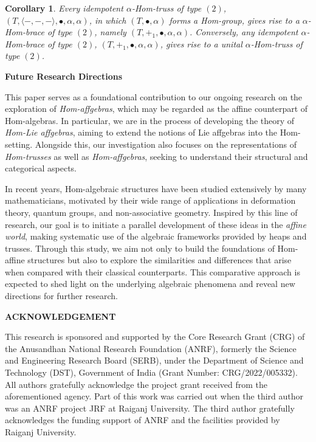 \documentclass[14pt]{article}
\theoremstyle{Definition}
\newtheorem{Coro}[thm]{Corollary}
\theoremstyle{remark}
\begin{document}
\begin{Coro}
Every idempotent $\alpha$-Hom-truss of type $(2)$, 
$(T,\langle -,-,- \rangle,\bullet,\alpha,\alpha)$, 
in which $(T,\bullet,\alpha)$ forms a Hom-group, gives rise to a $\alpha$-Hom-brace of type $(2)$, namely 
$(T,+_{1},\bullet,\alpha,\alpha)$. Conversely, any idempotent $\alpha$-Hom-brace of type $(2)$, 
$(T,+_{1},\bullet,\alpha,\alpha)$, gives rise to a unital $\alpha$-Hom-truss of type $(2)$.
\end{Coro}


\begin{center}
{\bf Future Research Directions}
\end{center}
This paper serves as a foundational contribution to our ongoing research on 
the exploration of \emph{Hom-affgebras}, which may be regarded as the affine 
counterpart of Hom-algebras. In particular, we are in the process of developing 
the theory of \emph{Hom-Lie affgebras}, aiming to extend the notions of 
Lie affgebras into the Hom-setting. Alongside this, our investigation also focuses 
on the representations of \emph{Hom-trusses} as well as \emph{Hom-affgebras}, 
seeking to understand their structural and categorical aspects.

In recent years, Hom-algebraic structures have been studied extensively by many 
mathematicians, motivated by their wide range of applications in deformation theory, 
quantum groups, and non-associative geometry. Inspired by this line of research, 
our goal is to initiate a parallel development of these ideas in the 
\emph{affine world}, making systematic use of the algebraic frameworks provided by 
heaps and trusses. Through this study, we aim not only to build the foundations 
of Hom-affine structures but also to explore the similarities and differences 
that arise when compared with their classical counterparts. This comparative 
approach is expected to shed light on the underlying algebraic phenomena and 
reveal new directions for further research.




\begin{center}
 {\bf ACKNOWLEDGEMENT}
 \end{center}
 
This research is sponsored and supported by the Core Research Grant (CRG) of the Anusandhan National Research Foundation (ANRF), formerly the Science and Engineering Research Board (SERB), under the Department of Science and Technology (DST), Government of India (Grant Number: CRG/2022/005332). All authors gratefully acknowledge the project grant received from the aforementioned agency. Part of this work was carried out when the third author was an ANRF project JRF at Raiganj University. The third author gratefully acknowledges the funding support of ANRF and the facilities provided by Raiganj University.
\end{document}

